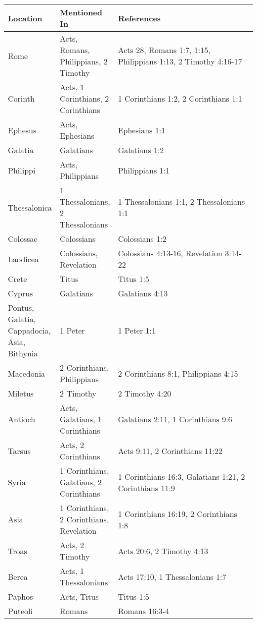\begin{longtable}[]{@{}p{0.15\linewidth} p{0.15\linewidth} p{0.7\linewidth}@{}}
    \toprule\noalign{}
    \begin{minipage}[b]{\linewidth}\raggedright
    Location
    \end{minipage} & \begin{minipage}[b]{\linewidth}\raggedright
    Mentioned In
    \end{minipage} & \begin{minipage}[b]{0.7\linewidth}\raggedright
    References
    \end{minipage} \\
    \midrule
    \endhead
    \bottomrule
    \endlastfoot
    Rome & Acts, Romans, Philippians, 2 Timothy & Acts 28, Romans 1:7, 1:15, Philippians 1:13, 2 Timothy 4:16-17 \\
    Corinth & Acts, 1 Corinthians, 2 Corinthians & 1 Corinthians 1:2, 2 Corinthians 1:1 \\
    Ephesus & Acts, Ephesians & Ephesians 1:1 \\
    Galatia & Galatians & Galatians 1:2 \\
    Philippi & Acts, Philippians & Philippians 1:1 \\
    Thessalonica & 1 Thessalonians, 2 Thessalonians & 1 Thessalonians 1:1, 2 Thessalonians 1:1 \\
    Colossae & Colossians & Colossians 1:2 \\
    Laodicea & Colossians, Revelation & Colossians 4:13-16, Revelation 3:14-22 \\
    Crete & Titus & Titus 1:5 \\
    Cyprus & Galatians & Galatians 4:13 \\
    Pontus, Galatia, Cappadocia, Asia, Bithynia & 1 Peter & 1 Peter 1:1 \\
    Macedonia & 2 Corinthians, Philippians & 2 Corinthians 8:1, Philippians 4:15 \\
    Miletus & 2 Timothy & 2 Timothy 4:20 \\
    Antioch & Acts, Galatians, 1 Corinthians & Galatians 2:11, 1 Corinthians 9:6 \\
    Tarsus & Acts, 2 Corinthians & Acts 9:11, 2 Corinthians 11:22 \\
    Syria & 1 Corinthians, Galatians, 2 Corinthians & 1 Corinthians 16:3, Galatians 1:21, 2 Corinthians 11:9 \\
    Asia & 1 Corinthians, 2 Corinthians, Revelation & 1 Corinthians 16:19, 2 Corinthians 1:8 \\
    Troas & Acts, 2 Timothy & Acts 20:6, 2 Timothy 4:13 \\
    Berea & Acts, 1 Thessalonians & Acts 17:10, 1 Thessalonians 1:7 \\
    Paphos & Acts, Titus & Titus 1:5 \\
    Puteoli & Romans & Romans 16:3-4 \\
\end{longtable}

